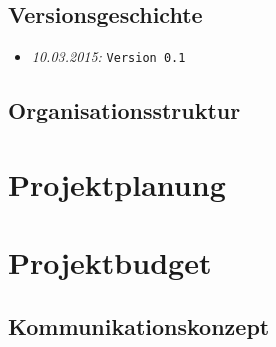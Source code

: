 \documentclass{fhnwreport/fhnwreport}
\begin{document}


\tableofcontents
\vspace{100mm}
\subsection*{Versionsgeschichte}
\begin{itemize}
    \item[]
        \emph{10.03.2015:} \texttt{Version 0.1}
\end{itemize}
\clearpage

\begin{landscape}
\section{Organisationsstruktur}
\label{sec:organisatsionsstruktur}

\end{landscape}

\clearpage
\section{Projektplanung}
\label{sec:projektplanung}


\section{Projektbudget}
\label{sec:Projektbudget}


\clearpage
\begin{landscape}
\section{Kommunikationskonzept}
\label{sec:kommunikationskonzept}

\end{landscape}
\end{document}

